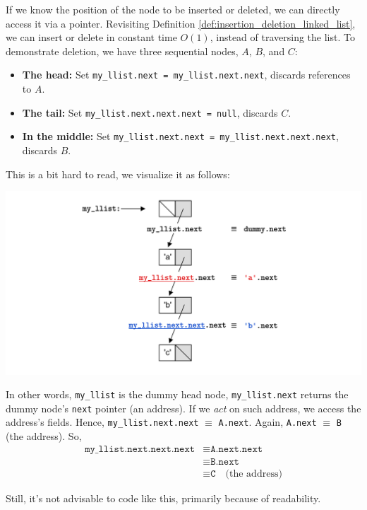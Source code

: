 \begin{Example}

    If we know the position of the node to be inserted or deleted, we can directly access it via a pointer. Revisiting 
    Definition \ref{def:insertion_deletion_linked_list}, we can insert or delete in constant time $O(1)$, instead of traversing the list.
    To demonstrate deletion, we have three sequential nodes, $A$, $B$, and $C$:

    \begin{itemize}
        \item \textbf{The head:} Set \texttt{my\_llist.next = my\_llist.next.next}, discards references to $A$.
        \item \textbf{The tail:} Set \texttt{my\_llist.next.next.next = null}, discards $C$.
        \item \textbf{In the middle:} Set \texttt{my\_llist.next.next = my\_llist.next.next.next}, discards $B$.
    \end{itemize}

    \noindent
    This is a bit hard to read, we visualize it as follows:

    \begin{center}
    
    \includegraphics[width=\textwidth]{Sections/hash/llist_dots.png}
    \end{center}

    \noindent
    In other words, \texttt{my\_llist} is the dummy head node, \texttt{my\_llist.next} returns the dummy node's \texttt{next} pointer (an address). 
    If we \emph{act} on such address, we access the address's fields. Hence, \texttt{my\_llist.next.next} $\equiv$ \texttt{A.next}. Again,
    \texttt{A.next} $\equiv$ \texttt{B} (the address). So,
    \begin{align*}
        \texttt{my\_llist.next.next.next} &\equiv \texttt{A.next.next} \\
        &\equiv \texttt{B.next} \\
        &\equiv \texttt{C} \quad \text{(the address)}
    \end{align*}

    \noindent
    Still, it's not advisable to code like this, primarily because of readability.
\end{Example}

